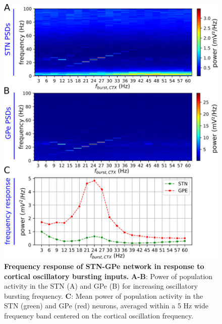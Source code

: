 %

\begin{figure}
\centering
\includegraphics[width=\textwidth]{ch_detailed_model/figs_split/fig_exogenous_resonance-psd-vectorlength_A-power.png}
\caption{
\textbf{Frequency response of STN-GPe network in response to cortical oscillatory bursting inputs.}
\textbf{A-B}: Power of population activity in the STN (A) and GPe (B) for increasing oscillatory bursting frequency.
\textbf{C}: Mean power of population activity in the STN (green) and GPe (red) neurons, averaged within a 5 Hz wide frequency band centered on the cortical oscillation frequency.
}
\label{fig:exogenous_ctx-resonance-response_A-power}
\end{figure}

